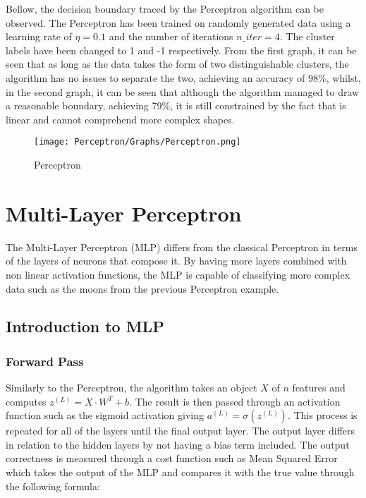 \documentclass{report}
\begin{document}
Bellow, the decision boundary traced by the Perceptron algorithm can be observed. The Perceptron has been trained on randomly generated data using a learning rate of $\eta=0.1$ and the number of iterations $n\_iter=4$. The cluster labels have been changed to 1 and -1 respectively. From the first graph, it can be seen that as long as the data takes the form of two distinguishable clusters, the algorithm has no issues to separate the two, achieving an accuracy of 98\%, whilst, in the second graph, it can be seen that although the algorithm managed to draw a reasonable boundary, achieving 79\%, it is still constrained by the fact that is linear and cannot comprehend more complex shapes. 


\begin{figure}[htp]
\centering
\texttt{[image: Perceptron/Graphs/Perceptron.png]}
\caption{Perceptron}
\label{Perceptron}
\end{figure}



\chapter{Multi-Layer Perceptron}

The Multi-Layer Perceptron (MLP) differs from the classical Perceptron in terms of the layers of neurons that compose it. By having more layers combined with non linear activation functions, the MLP is capable of classifying more complex data such as the moons from the previous Perceptron example. 

\section{Introduction to MLP}

\subsection{Forward Pass}
Similarly to the Perceptron, the algorithm takes an object $X$ of $n$ features and computes $z^{(L)}=X\cdot W^T+b$. The result is then passed through an activation function such as the sigmoid activation giving $a^{(L)}=\sigma(z^{(L)})$. This process is repeated for all of the layers until the final output layer. The output layer differs in relation to the hidden layers by not having a bias term included. The output correctness is measured through a cost function such as Mean Squared Error which takes the output of the MLP and compares it with the true value through the following formula:
\end{document}
